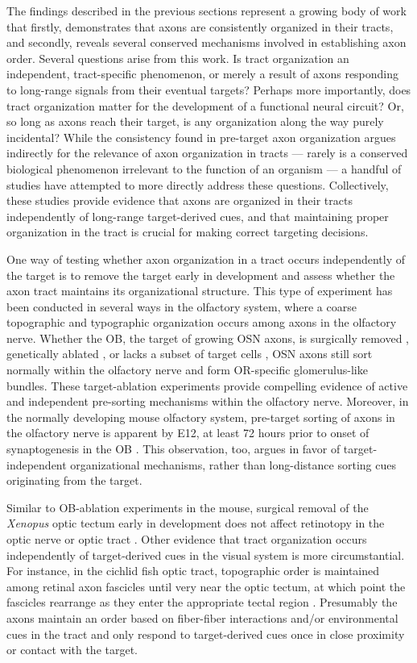 \label{sec:TractOrderIndependOfTargeting}
The findings described in the previous sections represent a growing body of work that firstly, demonstrates that axons are consistently organized in their tracts, and secondly, reveals several conserved mechanisms involved in establishing axon order.
Several questions arise from this work.
Is tract organization an independent, tract-specific phenomenon, or merely a result of axons responding to long-range signals from their eventual targets?
Perhaps more importantly, does tract organization matter for the development of a functional neural circuit?
Or, so long as axons reach their target, is any organization along the way purely incidental?
While the consistency found in pre-target axon organization argues indirectly for the relevance of axon organization in tracts --- rarely is a conserved biological phenomenon irrelevant to the function of an organism --- a handful of studies have attempted to more directly address these questions.
Collectively, these studies provide evidence that axons are organized in their tracts independently of long-range target-derived cues, and that maintaining proper organization in the tract is crucial for making correct targeting decisions.

One way of testing whether axon organization in a tract occurs independently of the target is to remove the target early in development and assess whether the axon tract maintains its organizational structure.
This type of experiment has been conducted in several ways in the olfactory system, where a coarse topographic and typographic organization occurs among axons in the olfactory nerve.
Whether the OB, the target of growing OSN axons, is surgically removed \cite{graziadei1978regeneration}, genetically ablated \cite{stjohn2003sorting}, or lacks a subset of target cells \cite{bulfone1998olfactory}, OSN axons still sort normally within the olfactory nerve and form OR-specific glomerulus-like bundles.
These target-ablation experiments provide compelling evidence of active and independent pre-sorting mechanisms within the olfactory nerve.
Moreover, in the normally developing mouse olfactory system, pre-target sorting of axons in the olfactory nerve is apparent by E12, at least 72 hours prior to onset of synaptogenesis in the OB \cite{miller2010axon}.
This observation, too, argues in favor of target-independent organizational mechanisms, rather than long-distance sorting cues originating from the target.

Similar to OB-ablation experiments in the mouse, surgical removal of the \emph{Xenopus} optic tectum early in development does not affect retinotopy in the optic nerve or optic tract \cite{reh1983organization}.
Other evidence that tract organization occurs independently of target-derived cues in the visual system is more circumstantial.
For instance, in the cichlid fish optic tract, topographic order is maintained among retinal axon fascicles until very near the optic tectum, at which point the fascicles rearrange as they enter the appropriate tectal region \cite{scholes1979nerve}.
Presumably the axons maintain an order based on fiber-fiber interactions and/or environmental cues in the tract and only respond to target-derived cues once in close proximity or contact with the target.

